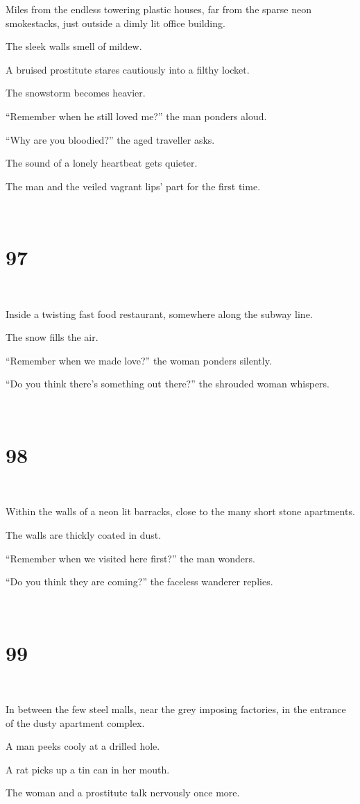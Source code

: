 \documentclass{report}
\begin{document}
Miles from the endless towering plastic houses, far from the sparse neon smokestacks, just outside a dimly lit office building.

The sleek walls smell of mildew.

A bruised prostitute stares cautiously into a filthy locket.

The snowstorm becomes heavier.

``Remember when he still loved me?'' the man ponders aloud.

``Why are you bloodied?'' the aged traveller asks.

The sound of a lonely heartbeat gets quieter.

The man and the veiled vagrant lips' part for the first time.

~
\chapter*{97}
~

Inside a twisting fast food restaurant, somewhere along the subway line.

The snow fills the air.

``Remember when we made love?'' the woman ponders silently.

``Do you think there's something out there?'' the shrouded woman whispers.

~
\chapter*{98}
~

Within the walls of a neon lit barracks, close to the many short stone apartments.

The walls are thickly coated in dust.

``Remember when we visited here first?'' the man wonders.

``Do you think they are coming?'' the faceless wanderer replies.

~
\chapter*{99}
~

In between the few steel malls, near the grey imposing factories, in the entrance of the dusty apartment complex.

A man peeks cooly at a drilled hole.

A rat picks up a tin can in her mouth.

The woman and a prostitute talk nervously once more.
\end{document}
